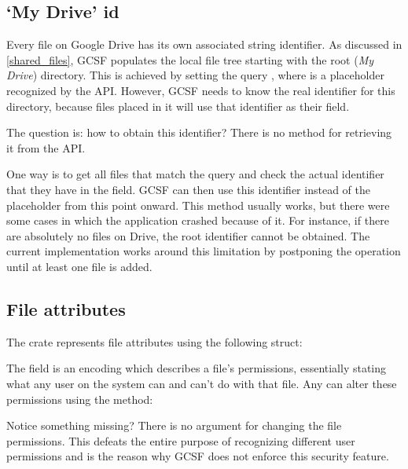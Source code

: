 \subsection{`My Drive' id}

Every file on Google Drive has its own associated string identifier. As discussed in \ref{shared_files}, GCSF populates the local file tree starting with the root (\emph{My Drive}) directory. This is achieved by setting the query , where  is a placeholder recognized by the API. However, GCSF needs to know the real identifier for this directory, because files placed in it will use that identifier as their  field.

The question is: how to obtain this identifier? There is no method for retrieving it from the API.

One way is to get all files that match the  query and check the actual identifier that they have in the  field. GCSF can then use this identifier instead of the  placeholder from this point onward. This method usually works, but there were some cases in which the application crashed because of it. For instance, if there are absolutely no files on Drive, the root identifier cannot be obtained. The current implementation works around this limitation by postponing the operation until at least one file is added.

\subsection{File attributes}

The  crate represents file attributes using the following struct:



The  field is an encoding which describes a file's permissions, essentially stating what any user on the system can and can't do with that file. Any  can alter these permissions using the  method:




Notice something missing? There is no argument for changing the file permissions. This defeats the entire purpose of recognizing different user permissions and is the reason why GCSF does not enforce this security feature.

